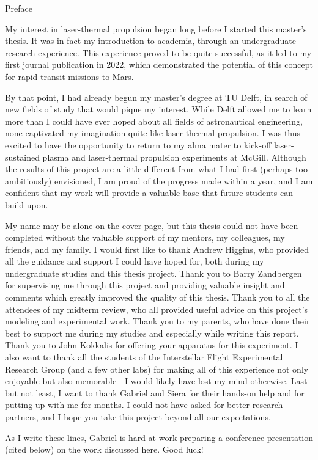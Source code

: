 \begin{plainchp}{Preface}
    \setcounter{page}{1}
    \begin{refsection}
    My interest in laser-thermal propulsion began long before I started this master's thesis. It was in fact my introduction to academia, through an undergraduate research experience. This experience proved to be quite successful, as it led to my first journal publication in 2022, which demonstrated the potential of this concept for rapid-transit missions to Mars.
    
    By that point, I had already begun my master's degree at TU Delft, in search of new fields of study that would pique my interest. While Delft allowed me to learn more than I could have ever hoped about all fields of astronautical engineering, none captivated my imagination quite like laser-thermal propulsion. I was thus excited to have the opportunity to return to my alma mater to kick-off laser-sustained plasma and laser-thermal propulsion experiments at McGill. Although the results of this project are a little different from what I had first (perhaps too ambitiously) envisioned, I am proud of the progress made within a year, and I am confident that my work will provide a valuable base that future students can build upon.

    My name may be alone on the cover page, but this thesis could not have been completed without the valuable support of my mentors, my colleagues, my friends, and my family. I would first like to thank Andrew Higgins, who provided all the guidance and support I could have hoped for, both during my undergraduate studies and this thesis project. Thank you to Barry Zandbergen for supervising me through this project and providing valuable insight and comments which greatly improved the quality of this thesis. Thank you to all the attendees of my midterm review, who all provided useful advice on this project's modeling and experimental work. Thank you to my parents, who have done their best to support me during my studies and especially while writing this report. Thank you to John Kokkalis for offering your apparatus for this experiment. I also want to thank all the students of the Interstellar Flight Experimental Research Group (and a few other labs) for making all of this experience not only enjoyable but also memorable---I would likely have lost my mind otherwise. Last but not least, I want to thank Gabriel and Siera for their hands-on help and for putting up with me for months. I could not have asked for better research partners, and I hope you take this project beyond all our expectations.

    As I write these lines, Gabriel is hard at work preparing a conference presentation (cited below) on the work discussed here. Good luck!

    \end{refsection}
\end{plainchp}